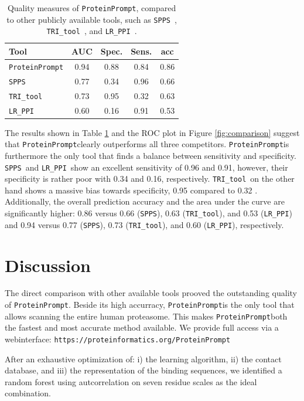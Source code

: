 \documentclass[preprint,3p,times,twocolumn]{elsarticle}
\newcommand{\url}[1]{\texttt{https://\small #1}}
\newcommand{\spps}{\texttt{SPPS}}
\newcommand{\tri}{\texttt{TRI\_tool}}
\newcommand{\lr}{\texttt{LR\_PPI}}
\newcommand{\tool}{\texttt{ProteinPrompt}\hspace{2pt}}
\newcommand{\website}{\url{proteinformatics.org/\tool}}
\begin{document}
\begin{table}
\begin{tabular}{|l |c | c | c | c |}
  \hline
  Tool  & AUC & Spec. & Sens. & acc \\
  \hline
  \tool  & 0.94 & 0.88 & 0.84 &  0.86 \\
  \hline
  \spps\  & 0.77 & 0.34 & 0.96 & 0.66 \\
  \hline
  \tri\  & 0.73 & 0.95 & 0.32 & 0.63 \\
  \hline
  \lr\  & 0.60 & 0.16 & 0.91 & 0.53  \\
  \hline
\end{tabular}
\caption{ Quality measures of \tool, compared to other publicly
  available tools, such as \spps\ \cite{Liu:2012}, \tri\
  \cite{Perovic:2017}, and \lr\ \cite{Pan:2010}. }
\label{table:comparison}
\end{table}

The results shown in Table \ref{table:comparison} and the ROC plot in
Figure \ref{fig:comparison} suggest that \tool clearly outperforms all
three competitors. \tool is furthermore the only tool that finds a
balance between sensitivity and specificity. \spps\ and \lr\ show an
excellent sensitivity of 0.96 and 0.91, however, their
specificity is rather poor with 0.34 and 0.16, respectively. \tri\ on
the other hand shows a massive bias towards specificity, 0.95 compared
to 0.32 . Additionally, the overall prediction accuracy and the area under the curve
are significantly higher: 0.86 versus 0.66 (\spps), 0.63 (\tri), and
0.53 (\lr) and 0.94 versus 0.77 (\spps), 0.73 (\tri), and 0.60 (\lr), respectively.


\section{Discussion}

The direct comparison with other available tools prooved the
outstanding quality of \tool. Beside its high accurracy, \tool is the
only tool that allows scanning the entire human proteasome. This makes
\tool both the fastest and most accurate method available. We provide
full access via a webinterface: \website

After an exhaustive optimization of: i) the learning algorithm, ii)
the contact database, and iii) the representation of the binding
sequences, we identified a random forest using autcorrelation on seven
residue scales as the ideal combination.
\end{document}
